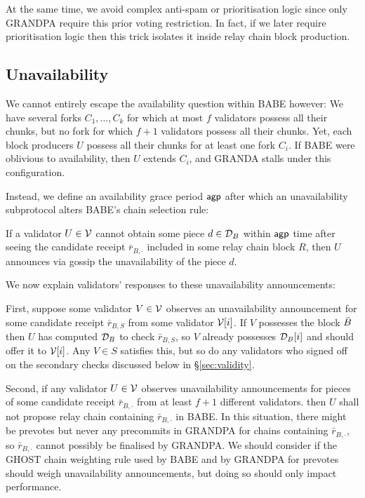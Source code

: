 At the same time, we avoid complex anti-spam or prioritisation logic since only GRANDPA require this prior voting restriction.  In fact, if we later require prioritisation logic then this trick isolates it inside relay chain block production.


\subsection{Unavailability} %
\label{sec:unavailability}

We cannot entirely escape the availability question within BABE however:  We have several forks $C_1,\ldots,C_k$ for which at most $f$ validators possess all their chunks, but no fork for which $f+1$ validators possess all their chunks.  Yet, each block producers $U$ possess all their chunks for at least one fork $C_i$.  If BABE were oblivious to availability, then $U$ extends $C_i$, and GRANDA stalls under this configuration. 

Instead, we define an availability grace period $\mathsf{agp}$ after which an unavailability subprotocol alters BABE's chain selection rule:  

If a validator $U \in \mathcal{V}$ cannot obtain some piece $d \in \mathcal{D}_B$ within $\mathsf{agp}$ time after seeing the candidate receipt $\bar{r}_{B,\cdot}$ included in some relay chain block $R$, then $U$ announces via gossip the unavailability of the piece $d$. 

We now explain validators' responses to these unavailability announcements:

First, suppose some validator $V \in \mathcal{V}$ observes an unavailability announcement for some candidate receipt $\bar{r}_{B,S}$ from some validator $\mathcal{V}[i]$.  If $V$ possesses the block $\bar{B}$ then $U$ has computed $\mathcal{D}_B$ to check $\bar{r}_{B,S}$, so $V$ already possesses $\mathcal{D}_B[i]$ and should offer it to $\mathcal{V}[i]$.  Any $V \in S$ satisfies this, but so do any validators who signed off on the secondary checks discussed below in \S\ref{sec:validity}. 

Second, if any validator $U \in \mathcal{V}$ observes unavailability announcements for pieces of some candidate receipt $\bar{r}_{B,\cdot}$ from at least $f+1$ different validators. then $U$ shall not propose relay chain containing $\bar{r}_{B,\cdot}$ in BABE.
In this situation, there might be prevotes but never any precommits in GRANDPA for chains containing  $\bar{r}_{B,\cdot}$, so $\bar{r}_{B,\cdot}$ cannot possibly be finalised by GRANDPA.  We should consider if the GHOST chain weighting rule used by BABE and by GRANDPA for prevotes should weigh unavailability announcements, but doing so should only impact performance.

